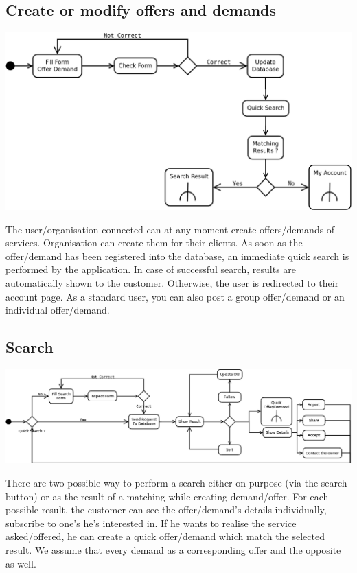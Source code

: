 \subsection{Create or modify offers and demands}

\begin{center}
	\includegraphics[width=.95\textwidth]{Create_Offer_Demand.png}
\end{center}
The user/organisation connected can at any moment create offers/demands of services. Organisation can create them for their clients. As soon as the offer/demand has been registered into the database, an immediate quick search is performed by the application. In case of successful search, results are automatically shown to the customer. Otherwise, the user is redirected to their account page.
As a standard user, you can also post a group offer/demand or an individual offer/demand.

\subsection{Search}

\begin{center}
	\hspace*{-1cm}
	\includegraphics[width=1.1\textwidth]{Search.png}
\end{center}
There are two possible way to perform a search either on purpose (via the search button) or as the result of a matching while creating demand/offer. For each possible result, the customer can see the offer/demand's details individually, subscribe to one's he's interested in. If he wants to realise the service asked/offered, he can create a quick offer/demand which match the selected result. We assume that every demand as a corresponding offer and the opposite as well. 
